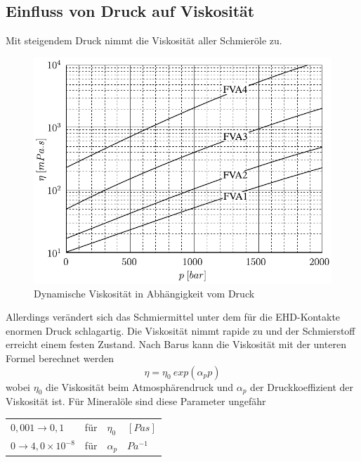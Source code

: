 \subsection*{Einfluss von Druck auf Viskosität}
\label{sub:einfluss_von_druck_auf_viskositaet}
Mit steigendem Druck nimmt die Viskosität aller Schmieröle zu.
\begin{figure}[htb]
    \centering
    \includegraphics[]{./images/viskositaet_druck.pdf}
    \caption{Dynamische Viskosität in Abhängigkeit vom Druck}
    \label{fig:dynamische_viskositaet_in_abhaengigkeit_vom_druck}
\end{figure}
%
Allerdings verändert sich das Schmiermittel unter dem für die EHD-Kontakte enormen Druck schlagartig.
Die Viskosität nimmt rapide zu und der Schmierstoff erreicht einem festen Zustand.
Nach Barus kann die Viskosität mit der unteren Formel berechnet werden
\begin{equation}
    \eta = \eta_0 \ exp(\alpha_p  p)
    \label{eq:dynamische_viskositaet_druck_barus}
\end{equation}
%
wobei $\eta_0$ die Viskosität beim Atmosphärendruck und $\alpha_p$ der Druckkoeffizient der Viskosität ist.
Für Mineralöle sind diese Parameter ungefähr

\begin{tabular}{llll}
    $0,001 \rightarrow 0,1$ & für & $\eta_0$ & $[Pas]$ \\
    $0 \rightarrow 4,0 \times 10^{-8}$ & für & $\alpha_p$ & $Pa^{-1}$
\end{tabular}

